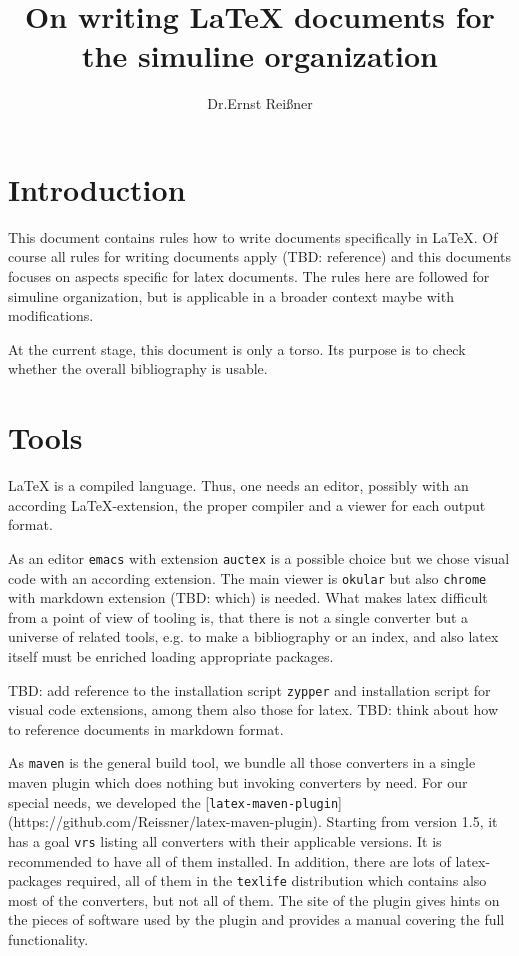 \documentclass[12pt]{article}
\begin{document}
\title{On writing \LaTeX{} documents for the simuline organization}
\author{Dr.Ernst Reißner}
\maketitle


\newpage

\tableofcontents %
\listoffigures
\listoftables

\section{Introduction}

This document contains rules how to write documents specifically in \LaTeX. 
Of course all rules for writing documents apply (TBD: reference) 
and this documents focuses on aspects specific for latex documents. 
The rules here are followed for simuline organization, 
but is applicable in a broader context maybe with modifications. 

At the current stage, this document is only a torso. 
Its purpose is to check whether the overall bibliography is usable. 


\section{Tools}\label{sec:tools}

\LaTeX{} is a compiled language. 
Thus, one needs an editor, possibly with an according \LaTeX-extension, 
the proper compiler and a viewer for each output format. 

As an editor \texttt{emacs} with extension \texttt{auctex} 
is a possible choice but we chose visual code with an according extension. 
The main viewer is \texttt{okular} but also \texttt{chrome} with markdown extension (TBD: which) 
is needed. 
What makes latex difficult from a point of view of tooling is, 
that there is not a single converter but a universe of related tools, 
e.g. to make a bibliography or an index, 
and also latex itself must be enriched loading appropriate packages. 

TBD: add reference to the installation script \texttt{zypper} 
and installation script for visual code extensions, among them also those for latex. 
TBD: think about how to reference documents in markdown format. 


As \texttt{maven} is the general build tool, we bundle all those converters 
in a single maven plugin which does nothing but invoking converters by need. 
For our special needs, we developed the 
[\texttt{latex-maven-plugin}](https://github.com/Reissner/latex-maven-plugin). 
Starting from version 1.5, it has a goal \texttt{vrs} listing all converters 
with their applicable versions. 
It is recommended to have all of them installed. 
In addition, there are lots of latex-packages required, 
all of them in the \texttt{texlife} distribution 
which contains also most of the converters, but not all of them. 
The site of the plugin gives hints on the pieces of software used by the plugin 
and provides a manual covering the full functionality. 
\end{document}
